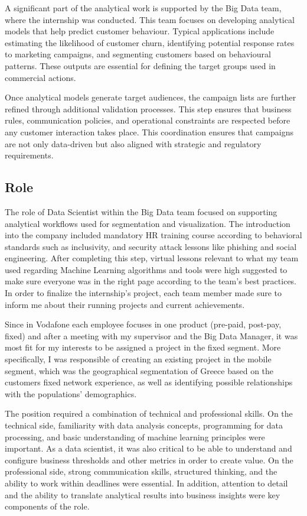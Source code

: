 \documentclass[12pt, a4paper, oneside]{report}
\begin{document}
A significant part of the analytical work is supported by the Big Data team, where the internship was conducted. This team focuses on developing analytical models that help predict customer behaviour. Typical applications include estimating the likelihood of customer churn, identifying potential response rates to marketing campaigns, and segmenting customers based on behavioural patterns. These outputs are essential for defining the target groups used in commercial actions.

Once analytical models generate target audiences, the campaign lists are further refined through additional validation processes. This step ensures that business rules, communication policies, and operational constraints are respected before any customer interaction takes place. This coordination ensures that campaigns are not only data-driven but also aligned with strategic and regulatory requirements.


\subsection{Role}
The role of Data Scientist within the Big Data team focused on supporting analytical workflows used for segmentation and visualization. The introduction into the company included mandatory HR training course according to behavioral standards such as inclusivity, and security attack lessons like phishing and social engineering. After completing this step, virtual lessons relevant to what my team used regarding Machine Learning algorithms and tools were high suggested to make sure everyone was in the right page according to the team’s best practices. In order to finalize the internship’s project, each team member made sure to inform me about their running projects and current achievements. 

Since in Vodafone each employee focuses in one product (pre-paid, post-pay, fixed) and after a meeting with my supervisor and the Big Data Manager, it was most fit for my interests to be assigned a project in the fixed segment. More specifically, I was responsible of creating an existing project in the mobile segment, which was the geographical segmentation of Greece based on the customers fixed network experience, as well as identifying possible relationships with the populations’ demographics.

The position required a combination of technical and professional skills. On the technical side, familiarity with data analysis concepts, programming for data processing, and basic understanding of machine learning principles were important. As a data scientist, it was also critical to be able to understand and configure business thresholds and other metrics in order to create value. On the professional side, strong communication skills, structured thinking, and the ability to work within deadlines were essential. In addition, attention to detail and the ability to translate analytical results into business insights were key components of the role.
\end{document}

